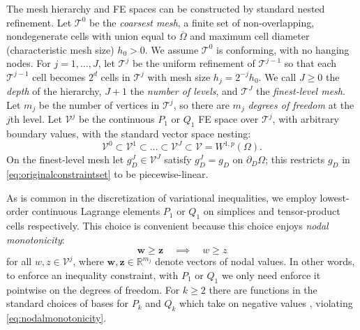 \documentclass[review,hidelinks,onefignum,onetabnum]{siamart220329}
\newcommand{\RR}{\mathbb{R}}
\newcommand{\bw}{\mathbf{w}}
\newcommand{\bz}{\mathbf{z}}
\begin{document}
The mesh hierarchy and FE spaces can be constructed by standard nested refinement.  Let $\mathcal{T}^0$ be the \emph{coarsest mesh}, a finite set of non-overlapping, nondegenerate cells with union equal to $\overline{\Omega}$ and maximum cell diameter (characteristic mesh size) $h_0>0$.  We assume $\mathcal{T}^0$ is conforming, with no hanging nodes.  For $j=1,\dots,J$, let $\mathcal{T}^j$ be the uniform refinement of $\mathcal{T}^{j-1}$ so that each $\mathcal{T}^{j-1}$ cell becomes $2^d$ cells in $\mathcal{T}^j$ with mesh size $h_j = 2^{-j} h_0$.  We call $J\ge 0$ the \emph{depth} of the hierarchy, $J+1$ the \emph{number of levels}, and $\mathcal{T}^J$ the \emph{finest-level mesh}.  Let $m_j$ be the number of vertices in $\mathcal{T}^j$, so there are $m_j$ \emph{degrees of freedom} at the $j$th level.  Let $\mathcal{V}^j$ be the continuous $P_1$ or $Q_1$ FE space over $\mathcal{T}^j$, with arbitrary boundary values, with the standard vector space nesting:
\begin{equation}
\mathcal{V}^0 \subset \mathcal{V}^1 \subset \dots \subset \mathcal{V}^J \subset \mathcal{V}=W^{1,p}(\Omega).  \label{eq:fe:nestedspaces}
\end{equation}
On the finest-level mesh let $g_D^J \in \mathcal{V}^J$ satisfy $g_D^J = g_D$ on $\partial_D \Omega$; this restricts $g_D$ in \eqref{eq:originalconstraintset} to be piecewise-linear.

As is common in the discretization of variational inequalities, we employ lowest-order continuous Lagrange elements $P_1$ or $Q_1$ on simplices and tensor-product cells respectively. This choice is convenient because this choice enjoys \emph{nodal monotonicity}:
\begin{equation}
\bw \ge \bz \quad \implies \quad w \ge z \label{eq:nodalmonotonicity}
\end{equation}
for all $w,z \in \mathcal{V}^j$, where $\bw,\bz \in \RR^{m_j}$ denote vectors of nodal values. In other words, to enforce an inequality constraint, with $P_1$ or $Q_1$ we only need enforce it pointwise on the degrees of freedom. For $k\ge 2$ there are functions in the standard choices of bases for $P_k$ and $Q_k$ which take on negative values \cite[Figure 1.7]{Elmanetal2014}, violating \eqref{eq:nodalmonotonicity}.
\end{document}
